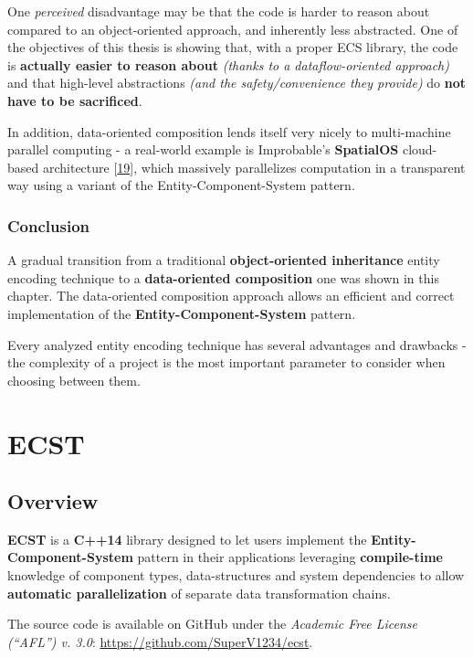 \documentclass[twoside, 12pt, a4paper, openright]{book}
\begin{document}
One \emph{perceived} disadvantage may be that the code is harder to
reason about compared to an object-oriented approach, and inherently
less abstracted. One of the objectives of this thesis is showing that,
with a proper ECS library, the code is \textbf{actually easier to reason
about} \emph{(thanks to a dataflow-oriented approach)} and that
high-level abstractions \emph{(and the safety/convenience they provide)}
do \textbf{not have to be sacrificed}.

In addition, data-oriented composition lends itself very nicely to
multi-machine parallel computing - a real-world example is Improbable's
\textbf{SpatialOS} cloud-based architecture
{[}\protect\hyperlink{ref-spatialos_learnmore}{19}{]}, which massively
parallelizes computation in a transparent way using a variant of the
Entity-Component-System pattern.

\section{Conclusion}\label{conclusion}

A gradual transition from a traditional \textbf{object-oriented
inheritance} entity encoding technique to a \textbf{data-oriented
composition} one was shown in this chapter. The data-oriented
composition approach allows an efficient and correct implementation of
the \textbf{Entity-Component-System} pattern.

Every analyzed entity encoding technique has several advantages and
drawbacks - the complexity of a project is the most important parameter
to consider when choosing between them.

\part{ECST}

\hypertarget{part2_ecst}{\chapter{Overview}\label{part2_ecst}}

\textbf{ECST} is a \textbf{C++14} library designed to let users
implement the \textbf{Entity-Component-System} pattern in their
applications leveraging \textbf{compile-time} knowledge of component
types, data-structures and system dependencies to allow
\textbf{automatic parallelization} of separate data transformation
chains.

The source code is available on GitHub under the \emph{Academic Free
License (``AFL'') v. 3.0}: \url{https://github.com/SuperV1234/ecst}.
\end{document}

